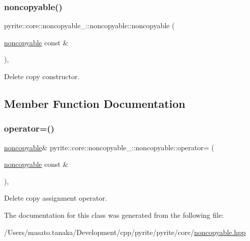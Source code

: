 \subsubsection{\texorpdfstring{noncopyable()}{noncopyable()}\hspace{0.1cm}{\footnotesize\ttfamily [2/2]}}
{\footnotesize\ttfamily pyrite\+::core\+::noncopyable\+\_\+\+::noncopyable\+::noncopyable (\begin{DoxyParamCaption}\item[{\mbox{\hyperlink{classpyrite_1_1core_1_1noncopyable___1_1noncopyable}{noncopyable}} const \&}]{ }\end{DoxyParamCaption})\hspace{0.3cm}{\ttfamily [protected]}, {\ttfamily [delete]}}

Delete copy constructor. 

\subsection{Member Function Documentation}
\mbox{\label{classpyrite_1_1core_1_1noncopyable___1_1noncopyable_a6c535716da364f40a0003d85c60d4261}} 
\subsubsection{\texorpdfstring{operator=()}{operator=()}}
{\footnotesize\ttfamily \mbox{\hyperlink{classpyrite_1_1core_1_1noncopyable___1_1noncopyable}{noncopyable}}\& pyrite\+::core\+::noncopyable\+\_\+\+::noncopyable\+::operator= (\begin{DoxyParamCaption}\item[{\mbox{\hyperlink{classpyrite_1_1core_1_1noncopyable___1_1noncopyable}{noncopyable}} const \&}]{ }\end{DoxyParamCaption})\hspace{0.3cm}{\ttfamily [protected]}, {\ttfamily [delete]}}

Delete copy assignment operator. 

The documentation for this class was generated from the following file\+:\begin{DoxyCompactItemize}
\item 
/\+Users/masato.\+tanaka/\+Development/cpp/pyrite/pyrite/core/\mbox{\hyperlink{noncopyable_8hpp}{noncopyable.\+hpp}}\end{DoxyCompactItemize}
